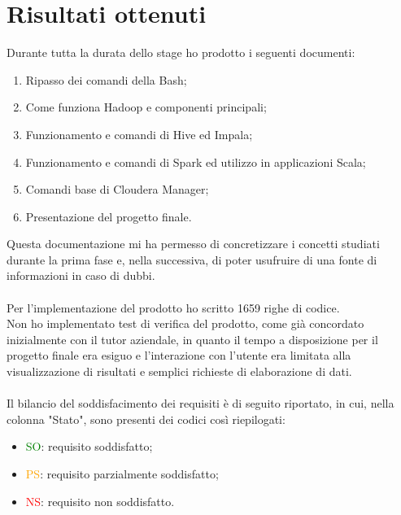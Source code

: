 \section{Risultati ottenuti}
Durante tutta la durata dello stage ho prodotto i seguenti documenti:
\begin{enumerate}
	\item Ripasso dei comandi della \gls{Bash};
	\item Come funziona Hadoop e componenti principali;
	\item Funzionamento e comandi di Hive ed Impala;
	\item Funzionamento e comandi di Spark ed utilizzo in applicazioni Scala;
	\item Comandi base di Cloudera Manager;
	\item Presentazione del progetto finale.
\end{enumerate}
Questa documentazione mi ha permesso di concretizzare i concetti studiati durante la prima fase e, nella successiva, di poter usufruire di una fonte di informazioni in caso di dubbi.\\\\
Per l'implementazione del prodotto ho scritto 1659 righe di codice.\\
Non ho implementato test di verifica del prodotto, come già concordato inizialmente con il tutor aziendale, in quanto il tempo a disposizione per il progetto finale era esiguo e l'interazione con l'utente era limitata alla visualizzazione di risultati e semplici richieste di elaborazione di dati.\\\\
Il bilancio del soddisfacimento dei requisiti è di seguito riportato, in cui, nella colonna "Stato", sono presenti dei codici così riepilogati:
\begin{itemize}
	\item \textcolor{green}{SO}: requisito soddisfatto;
	\item \textcolor{orange}{PS}: requisito parzialmente soddisfatto;
	\item \textcolor{red}{NS}: requisito non soddisfatto.
\end{itemize}

